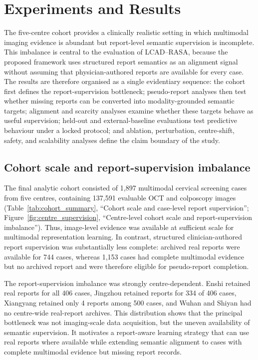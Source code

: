 \section{Experiments and Results}
\label{sec:experiments_results}

The five-centre cohort provides a clinically realistic setting in which multimodal imaging evidence is abundant but report-level semantic supervision is incomplete. This imbalance is central to the evaluation of LCAD--RASA, because the proposed framework uses structured report semantics as an alignment signal without assuming that physician-authored reports are available for every case. The results are therefore organised as a single evidentiary sequence: the cohort first defines the report-supervision bottleneck; pseudo-report analyses then test whether missing reports can be converted into modality-grounded semantic targets; alignment and scarcity analyses examine whether these targets behave as useful supervision; held-out and external-baseline evaluations test predictive behaviour under a locked protocol; and ablation, perturbation, centre-shift, safety, and scalability analyses define the claim boundary of the study.

\subsection{Cohort scale and report-supervision imbalance}
\label{subsec:cohort_results}

The final analytic cohort consisted of 1,897 multimodal cervical screening cases from five centres, containing 137,591 evaluable OCT and colposcopy images (Table~\ref{tab:cohort_summary}, ``Cohort scale and case-level report supervision''; Figure~\ref{fig:centre_supervision}, ``Centre-level cohort scale and report-supervision imbalance''). Thus, image-level evidence was available at sufficient scale for multimodal representation learning. In contrast, structured clinician-authored report supervision was substantially less complete: archived real reports were available for 744 cases, whereas 1,153 cases had complete multimodal evidence but no archived report and were therefore eligible for pseudo-report completion.

The report-supervision imbalance was strongly centre-dependent. Enshi retained real reports for all 406 cases, Jingzhou retained reports for 334 of 406 cases, Xiangyang retained only 4 reports among 500 cases, and Wuhan and Shiyan had no centre-wide real-report archives. This distribution shows that the principal bottleneck was not imaging-scale data acquisition, but the uneven availability of semantic supervision. It motivates a report-aware learning strategy that can use real reports where available while extending semantic alignment to cases with complete multimodal evidence but missing report records.

